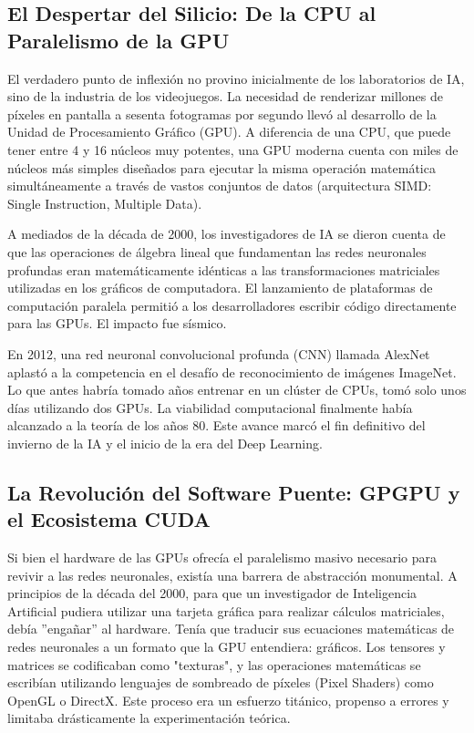 \documentclass[12pt,a4paper]{article}
\begin{document}
\subsection{El Despertar del Silicio: De la CPU al Paralelismo de la GPU}
El verdadero punto de inflexión no provino inicialmente de los laboratorios de IA, sino de la industria de los videojuegos. La necesidad de renderizar millones de píxeles en pantalla a sesenta fotogramas por segundo llevó al desarrollo de la Unidad de Procesamiento Gráfico (GPU). A diferencia de una CPU, que puede tener entre 4 y 16 núcleos muy potentes, una GPU moderna cuenta con miles de núcleos más simples diseñados para ejecutar la misma operación matemática simultáneamente a través de vastos conjuntos de datos (arquitectura SIMD: Single Instruction, Multiple Data).

A mediados de la década de 2000, los investigadores de IA se dieron cuenta de que las operaciones de álgebra lineal que fundamentan las redes neuronales profundas eran matemáticamente idénticas a las transformaciones matriciales utilizadas en los gráficos de computadora. El lanzamiento de plataformas de computación paralela permitió a los desarrolladores escribir código directamente para las GPUs. El impacto fue sísmico.

En 2012, una red neuronal convolucional profunda (CNN) llamada AlexNet aplastó a la competencia en el desafío de reconocimiento de imágenes ImageNet. Lo que antes habría tomado años entrenar en un clúster de CPUs, tomó solo unos días utilizando dos GPUs. La viabilidad computacional finalmente había alcanzado a la teoría de los años 80. Este avance marcó el fin definitivo del invierno de la IA y el inicio de la era del Deep Learning.

\subsection{La Revolución del Software Puente: GPGPU y el Ecosistema CUDA}
Si bien el hardware de las GPUs ofrecía el paralelismo masivo necesario para revivir a las redes neuronales, existía una barrera de abstracción monumental. A principios de la década del 2000, para que un investigador de Inteligencia Artificial pudiera utilizar una tarjeta gráfica para realizar cálculos matriciales, debía ''engañar'' al hardware. Tenía que traducir sus ecuaciones matemáticas de redes neuronales a un formato que la GPU entendiera: gráficos. Los tensores y matrices se codificaban como "texturas", y las operaciones matemáticas se escribían utilizando lenguajes de sombreado de píxeles (Pixel Shaders) como OpenGL o DirectX. Este proceso era un esfuerzo titánico, propenso a errores y limitaba drásticamente la experimentación teórica.
\end{document}
